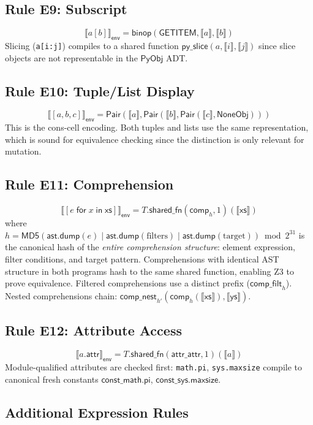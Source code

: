 \documentclass[11pt,a4paper]{report}
\theoremstyle{definition}
\theoremstyle{plain}
\newcommand{\den}[1]{\llbracket #1 \rrbracket}
\newcommand{\PyObj}{\mathsf{PyObj}}
\begin{document}
\subsection{Rule E9: Subscript}
\[
  \den{a[b]}_\mathsf{env} = \mathsf{binop}(\mathsf{GETITEM},
    \den{a}, \den{b})
\]
Slicing (\texttt{a[i:j]}) compiles to a shared function
$\mathsf{py\_slice}(a, \den{i}, \den{j})$ since slice objects
are not representable in the $\PyObj$ ADT.

\subsection{Rule E10: Tuple/List Display}
\[
  \den{[a, b, c]}_\mathsf{env} = \mathsf{Pair}(\den{a},
    \mathsf{Pair}(\den{b}, \mathsf{Pair}(\den{c}, \mathsf{NoneObj})))
\]
This is the cons-cell encoding.  Both tuples and lists use the
same representation, which is sound for equivalence checking
since the distinction is only relevant for mutation.

\subsection{Rule E11: Comprehension}
\[
  \den{[e \;\mathsf{for}\; x \;\mathsf{in}\; \mathsf{xs}]}_\mathsf{env}
    = T.\mathsf{shared\_fn}(\mathsf{comp}_{h}, 1)(\den{\mathsf{xs}})
\]
where $h = \mathsf{MD5}(\mathsf{ast.dump}(e) \mid
\mathsf{ast.dump}(\mathrm{filters}) \mid
\mathsf{ast.dump}(\mathrm{target})) \bmod 2^{31}$ is the canonical
hash of the \emph{entire comprehension structure}: element expression,
filter conditions, and target pattern.  Comprehensions with identical
AST structure in both programs hash to the same shared function,
enabling Z3 to prove equivalence.  Filtered comprehensions use
a distinct prefix ($\mathsf{comp\_filt}_{h}$).
Nested comprehensions chain:
$\mathsf{comp\_nest}_{h'}(\mathsf{comp}_{h}(\den{\mathsf{xs}}),
\den{\mathsf{ys}})$.

\subsection{Rule E12: Attribute Access}
\[
  \den{a.\mathsf{attr}}_\mathsf{env} = T.\mathsf{shared\_fn}(
    \mathsf{attr\_attr}, 1)(\den{a})
\]
Module-qualified attributes are checked first: \texttt{math.pi},
\texttt{sys.maxsize} compile to canonical fresh constants
$\mathsf{const\_math.pi}$, $\mathsf{const\_sys.maxsize}$.

\subsection{Additional Expression Rules}
\end{document}
